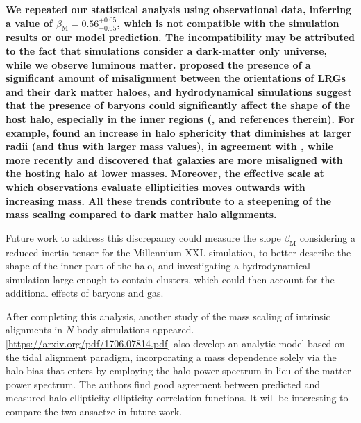 \documentclass[a4paper,fleqn,usenatbib]{mnras}
\newenvironment{correction}
 {\bfseries}%
  {}%
\begin{document}
\begin{correction}
We repeated our statistical analysis using observational data, inferring a value of $\beta_{\mathrm{M}} = 0.56^{+0.05}_{-0.05}$, which is not compatible with the simulation results or our model prediction.
The incompatibility may be attributed to the fact that simulations consider a dark-matter only universe, while we observe luminous matter. \citet{Okumuraetal2009} proposed the presence of a significant amount of misalignment between the orientations of LRGs and their dark matter haloes, and hydrodynamical simulations suggest that the presence of baryons could significantly affect the shape of the host halo, especially in the inner regions (\citealt{Kiesslingetal2015}, and references therein). For example, \citet{Bailinetal2005} found an increase in halo sphericity that diminishes at larger radii (and thus with larger mass values), in agreement with \citet{Kazantzidisetal2004}, while more recently \citet{Tennetietal2014} and \citet{Velliscigetal2015a} discovered that galaxies are more misaligned with the hosting halo at lower masses. Moreover, the effective scale at which observations evaluate ellipticities moves outwards with increasing mass. All these trends contribute to a steepening of the mass scaling compared to dark matter halo alignments.


Future work to address this discrepancy could measure the slope $\beta_{\mathrm{M}}$ considering a reduced inertia tensor for the Millennium-XXL simulation, to better describe the shape of the inner part of the halo, and investigating a hydrodynamical simulation large enough to contain clusters, which could then account for the additional effects of baryons and gas. 

After completing this analysis, another study of the mass scaling of intrinsic alignments in $N$-body simulations appeared. [\href{https://arxiv.org/pdf/1706.07814.pdf}{https://arxiv.org/pdf/1706.07814.pdf}] also develop an analytic model based on the tidal alignment paradigm, incorporating a mass dependence solely via the halo bias that enters by employing the halo power spectrum in lieu of the matter power spectrum. The authors find good agreement between predicted and measured halo ellipticity-ellipticity correlation functions. It will be interesting to compare the two ansaetze in future work.
\end{correction}
\end{document}

